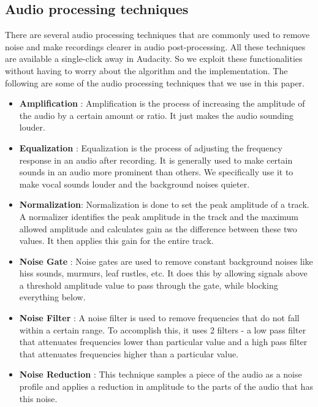 \subsection{Audio processing techniques}
There are several audio processing techniques that are commonly used to remove noise and make recordings clearer in audio post-processing. All these techniques are available a single-click away in Audacity. So we exploit these functionalities without having to worry about the algorithm and the implementation. The following are some of the audio processing techniques that we use in this paper.\newline

\begin{itemize}
\item \textbf{Amplification} : Amplification is the process of increasing the amplitude of the audio by a certain amount or ratio. It just makes the audio sounding louder.
\item \textbf{Equalization} : Equalization is the process of adjusting the frequency response in an audio after recording. It is generally used to make certain sounds in an audio more prominent than others. We specifically use it to make vocal sounds louder and the background noises quieter.
\item \textbf{Normalization}: Normalization is done to set the peak amplitude of a track. A normalizer identifies the peak amplitude in the track and the maximum allowed amplitude and calculates gain as the difference between these two values. It then applies this gain for the entire track.
\item \textbf{Noise Gate} : Noise gates are used to remove constant background noises like hiss sounds, murmurs, leaf rustles, etc. It does this by allowing signals above a threshold amplitude value to pass through the gate, while blocking everything below.
\item \textbf{Noise Filter} : A noise filter is used to remove frequencies that do not fall within a certain range. To accomplish this, it uses 2 filters - a low pass filter that attenuates frequencies lower than  particular value and a high pass filter that attenuates frequencies higher than a particular value.
\item \textbf{Noise Reduction} : This technique samples a piece of the audio as a noise profile and applies a reduction in amplitude to the parts of the audio that has this noise.
\end{itemize}


